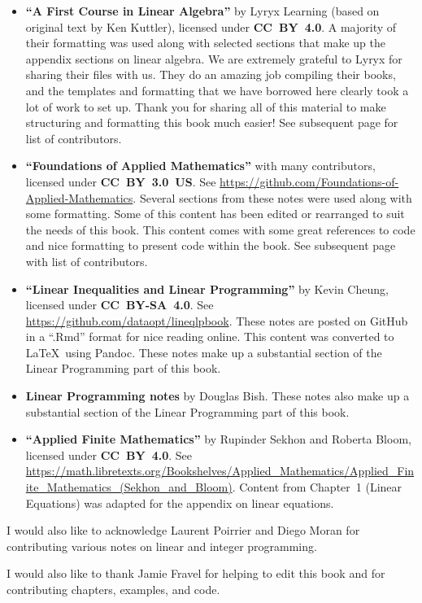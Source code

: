 \begin{itemize}
\item \textbf{``A First Course in Linear Algebra''} by Lyryx Learning (based on original text by Ken Kuttler), licensed under \textbf{CC~BY~4.0}.   A majority of their formatting was used along with selected sections that make up the appendix sections on linear algebra. We are extremely grateful to Lyryx for sharing their files with us.  They do an amazing job compiling their books, and the templates and formatting that we have borrowed here clearly took a lot of work to set up.  Thank you for sharing all of this material to make structuring and formatting this book much easier! See subsequent page for list of contributors.

\item \textbf{``Foundations of Applied Mathematics''} with many contributors, licensed under \textbf{CC~BY~3.0~US}.  See \url{https://github.com/Foundations-of-Applied-Mathematics}.  Several sections from these notes were used along with some formatting.  Some of this content has been edited or rearranged to suit the needs of this book.  This content comes with some great references to code and nice formatting to present code within the book.   See subsequent page with list of contributors.

\item \textbf{``Linear Inequalities and Linear Programming''} by
Kevin Cheung, licensed under \textbf{CC~BY-SA~4.0}.  See \url{https://github.com/dataopt/lineqlpbook}.  These notes are posted on GitHub in a ``.Rmd'' format for nice reading online.  This content was converted to \LaTeX\ using Pandoc.    These notes make up a substantial section of the Linear Programming part of this book.

\item \textbf{Linear Programming notes} by Douglas Bish.  These notes also make up a substantial section of the Linear Programming part of this book.

\item \textbf{``Applied Finite Mathematics''} by Rupinder Sekhon and Roberta Bloom, licensed under \textbf{CC~BY~4.0}.  See \url{https://math.libretexts.org/Bookshelves/Applied_Mathematics/Applied_Finite_Mathematics_(Sekhon_and_Bloom)}.  Content from Chapter~1 (Linear Equations) was adapted for the appendix on linear equations.
\end{itemize}

I would also like to acknowledge Laurent Poirrier and Diego Moran for contributing various notes on linear and integer programming.

I would also like to thank Jamie Fravel for helping to edit this book and for contributing chapters, examples, and code.

\newpage

